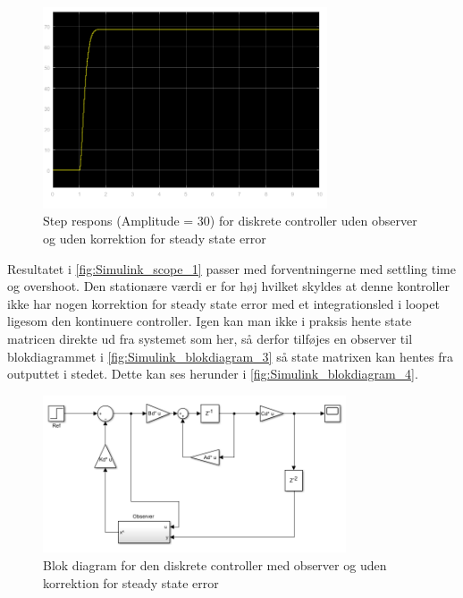 \begin{figure}[H]
	\centering
	\includegraphics[width = 0.75\textwidth]{figur/Simulink_scope_3}
	\caption{Step respons (Amplitude = 30) for diskrete controller uden observer og uden korrektion for steady state error}
	\label{fig:Simulink_scope_3}
\end{figure}

Resultatet i \autoref{fig:Simulink_scope_1} passer med forventningerne med settling time og overshoot. Den stationære værdi er for høj hvilket skyldes at denne kontroller ikke har nogen korrektion for steady state error med et integrationsled i loopet ligesom den kontinuere controller. Igen
kan man ikke i praksis hente state matricen direkte ud fra systemet som her, så derfor tilføjes en observer til blokdiagrammet i \autoref{fig:Simulink_blokdiagram_3} så state matrixen kan hentes fra outputtet i stedet. Dette kan ses herunder i \autoref{fig:Simulink_blokdiagram_4}.

\begin{figure}[H]
	\centering
	\includegraphics[width = 0.8\textwidth]{figur/Simulink_blokdiagram_4}
	\caption{Blok diagram for den diskrete controller med observer og uden korrektion for steady state error}
	\label{fig:Simulink_blokdiagram_4}
\end{figure}

